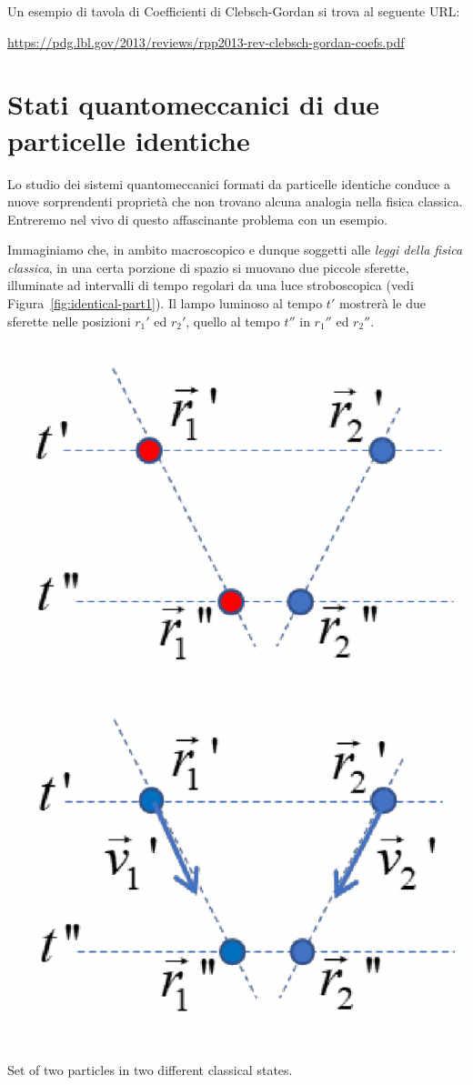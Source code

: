Un esempio di tavola di Coefficienti di Clebsch-Gordan si trova al seguente URL:
\begin{center}
    \url{https://pdg.lbl.gov/2013/reviews/rpp2013-rev-clebsch-gordan-coefs.pdf}
\end{center}

\section{Stati quantomeccanici di due particelle identiche}\label{sec:particelle-identiche}
Lo studio dei sistemi quantomeccanici formati da particelle identiche conduce a nuove sorprendenti proprietà che non trovano alcuna analogia nella fisica classica. Entreremo nel vivo di questo affascinante problema con un esempio.
\bigskip

Immaginiamo che, in ambito macroscopico e dunque soggetti alle \emph{leggi della fisica classica}, in una certa porzione di spazio si muovano due piccole sferette, illuminate ad intervalli di tempo regolari da una luce stroboscopica (vedi Figura~\ref{fig:identical-part1}).
Il lampo luminoso al tempo $t'$ mostrerà le due sferette nelle posizioni $r_{1}'$ ed $r_{2}'$, quello al tempo $t''$ in $r_{1}''$ ed $r_{2}''$.
\begin{marginfigure}
    \includegraphics{figs/identical-part1}
    \caption{Set of two particles in two different classical states.}
    \label{fig:identical-part1}
\end{marginfigure}
